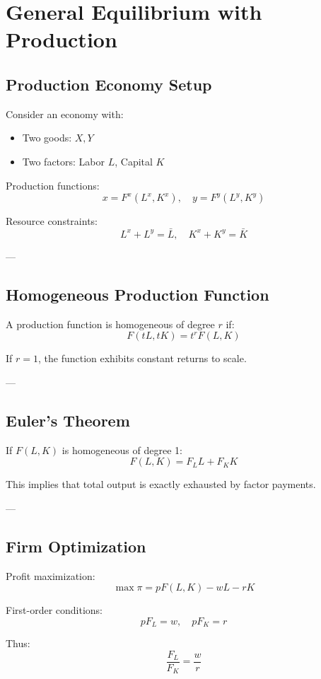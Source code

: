 \chapter{General Equilibrium with Production}

\section{Production Economy Setup}

Consider an economy with:
\begin{itemize}
    \item Two goods: $X, Y$
    \item Two factors: Labor $L$, Capital $K$
\end{itemize}

Production functions:
\[
x = F^x(L^x, K^x), \quad
y = F^y(L^y, K^y)
\]

Resource constraints:
\[
L^x + L^y = \bar{L}, \quad
K^x + K^y = \bar{K}
\]

---

\section{Homogeneous Production Function}

A production function is homogeneous of degree $r$ if:
\[
F(tL, tK) = t^r F(L,K)
\]

If $r=1$, the function exhibits constant returns to scale.

---

\section{Euler's Theorem}

If $F(L,K)$ is homogeneous of degree 1:
\[
F(L,K) = F_L L + F_K K
\]

This implies that total output is exactly exhausted by factor payments.

---

\section{Firm Optimization}

Profit maximization:
\[
\max \pi = pF(L,K) - wL - rK
\]

First-order conditions:
\[
pF_L = w, \quad pF_K = r
\]

Thus:
\[
\frac{F_L}{F_K} = \frac{w}{r}
\]


